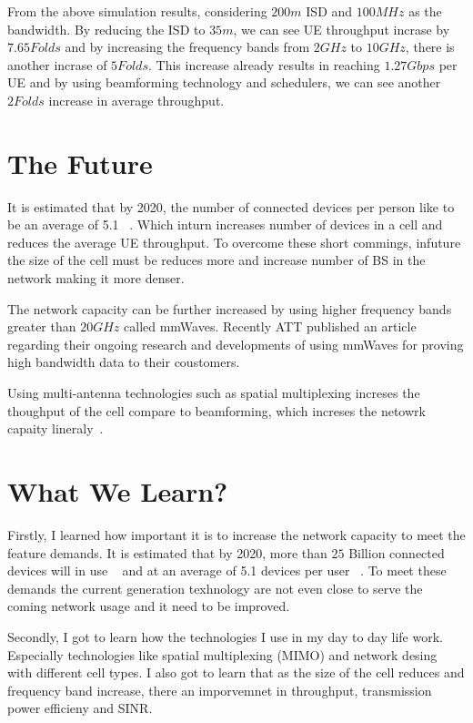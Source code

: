 \documentclass[12pt,onecolumn]{IEEEtran}
\begin{document}
From the above simulation results, considering $200m$ ISD and $100MHz$ as the bandwidth. By reducing the ISD to $35m$, we can see UE throughput incrase by $7.65Folds$ and by increasing the frequency bands from $2GHz$ to $10GHz$, there is another incrase of $5Folds$. This increase already results in reaching $1.27Gbps$ per UE and by using beamforming technology and schedulers, we can see another $2Folds$ increase in average throughput.

\section{The Future}
\label{sec:TF}

It is estimated that by 2020, the number of connected devices per person like to be an average of 5.1 ~\cite{main_paper}. Which inturn increases number of devices in a cell and reduces the average UE throughput. To overcome these short commings, infuture the size of the cell must be reduces more and increase number of BS in the network making it more denser.

The network capacity can be further increased by using higher frequency bands greater than $20GHz$ called mmWaves. Recently ATT published an article ~\cite{att} regarding their ongoing research and developments of using mmWaves for proving high bandwidth data to their coustomers.

Using multi-antenna technologies such as spatial multiplexing increses the thoughput of the cell compare to beamforming, which increses the netowrk capaity lineraly~\cite{satial_mul}.

\section{What We Learn?}
\label{sec:WWL}

Firstly, I learned how important it is to increase the network capacity to meet the feature demands. It is estimated that by 2020, more than $25$ Billion connected devices will in use ~\cite{Gartner} and at an average of 5.1 devices per user ~\cite{frost_sullivan}. To meet these demands the current generation texhnology are not even close to serve the coming network usage and it need to be improved.

Secondly, I got to learn how the technologies I use in my day to day life work. Especially technologies like spatial multiplexing (MIMO) and network desing with different cell types. I also got to learn that as the size of the cell reduces and frequency band increase, there an imporvemnet in throughput, transmission power efficieny and SINR.
\end{document}
